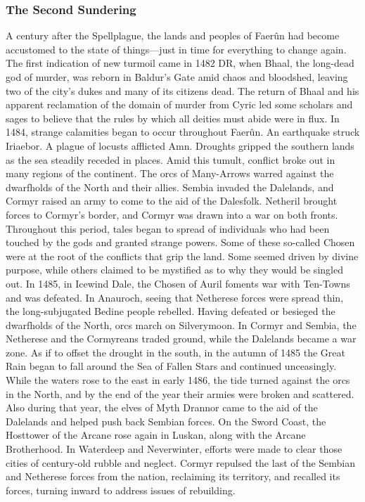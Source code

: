 \documentclass[10pt,a4paper,twoside,twocolumn,openany,bg=print,nodeprecatedcode]{dndbook}
\begin{document}
\subsubsection{The Second Sundering}
A century after the Spellplague, the lands and peoples of Faerûn had become accustomed to the state of things—just in time for everything to change again.
The first indication of new turmoil came in 1482 DR, when Bhaal, the long-dead god of murder, was reborn in Baldur's Gate amid chaos and bloodshed, leaving two of the city's dukes and many of its citizens dead. The return of Bhaal and his apparent reclamation of the domain of murder from Cyric led some scholars and sages to believe that the rules by which all deities must abide were in flux.
In 1484, strange calamities began to occur throughout Faerûn. An earthquake struck Iriaebor. A plague of locusts afflicted Amn. Droughts gripped the southern lands as the sea steadily receded in places. Amid this tumult, conflict broke out in many regions of the continent. The orcs of Many-Arrows warred against the dwarfholds of the North and their allies. Sembia invaded the Dalelands, and Cormyr raised an army to come to the aid of the Dalesfolk. Netheril brought forces to Cormyr's border, and Cormyr was drawn into a war on both fronts.
Throughout this period, tales began to spread of individuals who had been touched by the gods and granted strange powers. Some of these so-called Chosen were at the root of the conflicts that grip the land. Some seemed driven by divine purpose, while others claimed to be mystified as to why they would be singled out.
In 1485, in Icewind Dale, the Chosen of Auril foments war with Ten-Towns and was defeated. In Anauroch, seeing that Netherese forces were spread thin, the long-subjugated Bedine people rebelled. Having defeated or besieged the dwarfholds of the North, orcs march on Silverymoon. In Cormyr and Sembia, the Netherese and the Cormyreans traded ground, while the Dalelands became a war zone. As if to offset the drought in the south, in the autumn of 1485 the Great Rain began to fall around the Sea of Fallen Stars and continued unceasingly.
While the waters rose to the east in early 1486, the tide turned against the orcs in the North, and by the end of the year their armies were broken and scattered. Also during that year, the elves of Myth Drannor came to the aid of the Dalelands and helped push back Sembian forces. On the Sword Coast, the Hosttower of the Arcane rose again in Luskan, along with the Arcane Brotherhood. In Waterdeep and Neverwinter, efforts were made to clear those cities of century-old rubble and neglect. Cormyr repulsed the last of the Sembian and Netherese forces from the nation, reclaiming its territory, and recalled its forces, turning inward to address issues of rebuilding.
\end{document}
